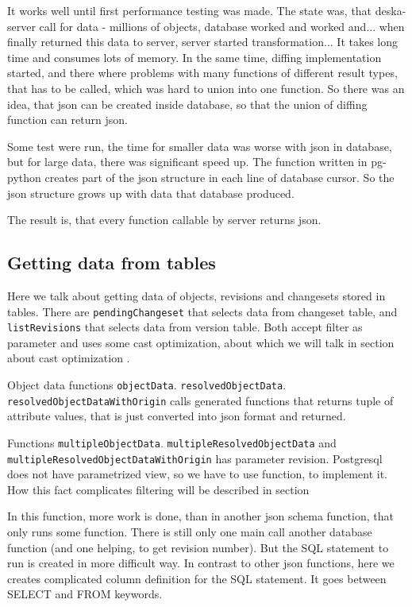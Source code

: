 \documentclass[deska]{subfiles}
\begin{document}
It works well until first performance testing was made. The state was, that deska-server call for data - millions of objects,
database worked and worked and... when finally returned this data to server, server started transformation... It takes long time
and consumes lots of memory.
In the same time, diffing implementation started, and there where problems with many functions of different result types,
that has to be called, which was hard to union into one function.
So there was an idea, that json can be created inside database, so that the union of diffing function can return json.

Some test were run, the time for smaller data was worse with json in database, but for large data, there was significant
speed up. The function written in pg-python creates part of the json structure in each line of database cursor.
So the json structure grows up with data that database produced.

The result is, that every function callable by server returns json.

\subsection{Getting data from tables}
\label{sec:data-functions}
Here we talk about getting data of objects, revisions and changesets stored in tables.
There are {\tt pendingChangeset} that selects data from changeset table, and {\tt listRevisions} that selects data from version table.
Both accept filter as parameter and uses some cast optimization, about which we will talk in section about cast
optimization .

Object data functions {\tt objectData}. {\tt resolvedObjectData}. {\tt resolvedObjectDataWithOrigin} calls generated functions 
that returns tuple of attribute values, that is just converted into json format and returned. 

Functions {\tt multipleObjectData}. {\tt multipleResolvedObjectData} and {\tt multipleResolvedObjectDataWithOrigin} has parameter revision.
Postgresql does not have parametrized view, so we have to use function, to implement it. How this fact complicates filtering will
be described in section 

In this function, more work is done, than in another json schema function, that only runs some function.
There is still only one main call another database function (and one helping, to get revision number).
But the SQL statement to run is created in more difficult way. In contrast to other json functions,
here we creates complicated column definition for the SQL statement. It goes between SELECT and FROM keywords.
\end{document}

